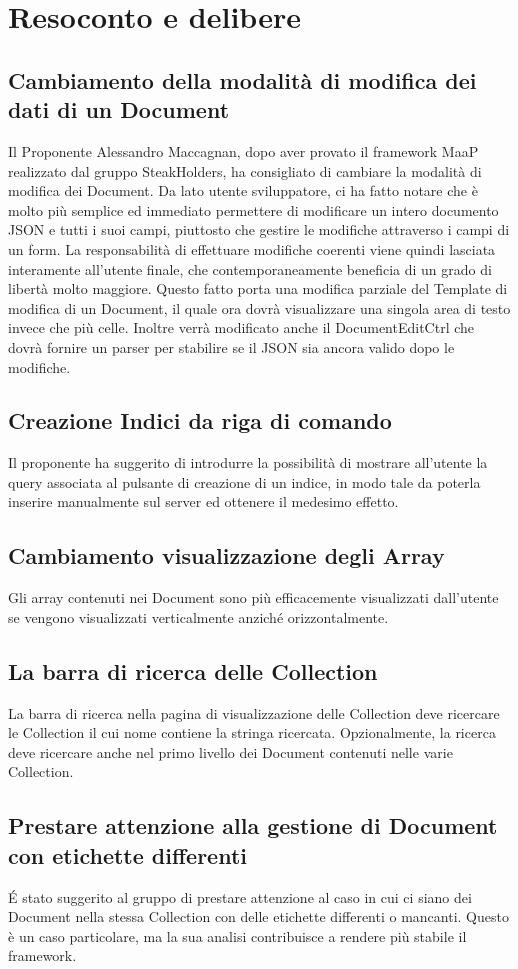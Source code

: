\newpage
\section{Resoconto e delibere}
\label{2}

\subsection{Cambiamento della modalità di modifica dei dati di un Document}
Il Proponente Alessandro Maccagnan, dopo aver provato il framework MaaP realizzato dal gruppo SteakHolders, 
ha consigliato di cambiare la modalità di modifica dei Document.
Da lato utente sviluppatore, ci ha fatto notare che è molto più semplice ed immediato permettere di modificare un intero documento 
JSON e tutti i suoi campi, piuttosto che gestire le modifiche attraverso i campi di un form. 
La responsabilità di effettuare modifiche coerenti viene quindi lasciata interamente all'utente finale, che contemporaneamente beneficia di un grado di libertà molto maggiore.
Questo fatto porta una modifica parziale del Template di modifica di un Document, il quale ora dovrà visualizzare una singola
area di testo invece che più celle. Inoltre verrà modificato anche il DocumentEditCtrl che dovrà fornire un parser per stabilire se il JSON sia ancora valido dopo le modifiche.

\subsection{Creazione Indici da riga di comando}
Il proponente ha suggerito di introdurre la possibilità di mostrare all'utente la query associata al pulsante di creazione di un indice, in modo tale da poterla inserire manualmente sul server ed ottenere il medesimo effetto.

\subsection{Cambiamento visualizzazione degli Array}
Gli array contenuti nei Document sono più efficacemente visualizzati dall'utente se vengono visualizzati verticalmente
anziché orizzontalmente.

\subsection{La barra di ricerca delle Collection}
La barra di ricerca nella pagina di visualizzazione delle Collection deve ricercare le Collection il cui nome contiene la stringa ricercata.
Opzionalmente, la ricerca deve ricercare anche nel primo livello dei Document contenuti nelle varie Collection. 

\subsection{Prestare attenzione alla gestione di Document con etichette differenti}
\'{E} stato suggerito al gruppo di prestare attenzione al caso in cui ci siano dei Document nella stessa Collection con delle etichette 
differenti o mancanti. Questo è un caso particolare, ma la sua analisi contribuisce a rendere più stabile il framework.

